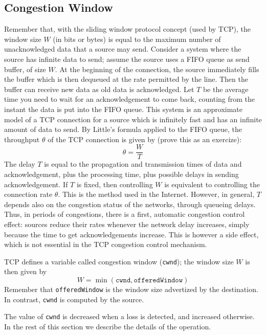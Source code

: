 \subsection{Congestion Window}

Remember that, with the sliding window protocol concept (used by TCP),
the window size $W$ (in bits or bytes) is equal to the maximum number
of unacknowledged data that a source may send.  Consider a system
where the source has infinite data to send; assume the source uses a
FIFO queue as send buffer, of size $W$.  At the beginning of the connection,
the source immediately fills the buffer which is then dequeued at the
rate permitted by the line.  Then the buffer can receive new data as
old data is acknowledged. Let $T$ be the average time you need
to wait for an acknowledgement to come back, counting from the
instant the data is put into the FIFO queue. This system is an approximate
model of a TCP connection for a source which is infinitely fast and
has an infinite amount of data to send. By Little's formula applied to
the FIFO queue, the throughput $\theta$ of the TCP connection is given by
(prove this as an exercize):
\begin{equation}
        \theta =\frac{ W}{T}
        \label{eq-d32-i8}
\end{equation}
The delay $T$ is equal to the propagation and transmission times of
data and acknowledgement, plus the processing time, plus possible
delays in sending acknowledgement. If $T$ is fixed, then controlling $W$
is equivalent to controlling the connection rate $\theta$. This is
the method used in the Internet. However, in general, $T$ depends
also on the congestion status of the networks, through queueing
delays. Thus, in periods of congestions, there is a first, automatic
congestion control effect: sources reduce their rates whenever the network
delay increases, simply because the time to get acknowledgements
increase. This is however a side effect, which is not essential in
the TCP congestion control mechanism.

TCP defines a variable called congestion window (\texttt{cwnd}); the
window size $W$ is then given by
$$W = \min ( \texttt{cwnd}, \texttt{offeredWindow})$$
Remember that \texttt{offeredWindow} is the window size advertized by
the destination. In contrast, \texttt{cwnd} is computed by the source.

The value of \texttt{cwnd} is decreased when a loss is detected, and
increased otherwise.  In the rest of this section we describe the
details of the operation.

